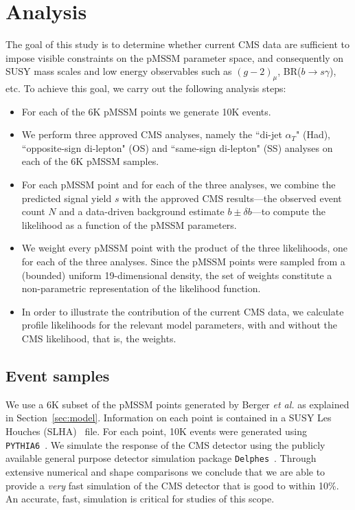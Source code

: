 \section{Analysis}

The goal of this study is to determine whether current CMS data are sufficient to impose visible constraints on the pMSSM parameter space, and consequently on SUSY mass scales and low energy observables such as $(g-2)_\mu$, BR($b\rightarrow s\gamma$), etc.  To achieve this goal, we carry out the following analysis steps:
\begin{itemize}
\item For each of the 6K pMSSM points we generate 10K events.
\item We perform three approved CMS analyses, namely the
 ``di-jet $\alpha_T$" (Had), ``opposite-sign di-lepton" (OS) and ``same-sign di-lepton" (SS) 
 analyses on each of the 6K pMSSM samples.
\item For each pMSSM point and for each of the three analyses, we combine the 
predicted signal yield $s$ with the approved CMS results---the
observed event count $N$ and 
a data-driven background estimate $b \pm \delta b$---to compute the likelihood as a function
of the pMSSM parameters. 
\item We weight every pMSSM point with the product of the three likelihoods, one  for each
of the three analyses. Since the pMSSM points were sampled from a (bounded) 
uniform  19-dimensional density, the set of weights constitute a non-parametric 
representation of the likelihood function. 
\item In order to illustrate the contribution of the current CMS data, we calculate profile likelihoods 
for the relevant model parameters, with and without the CMS likelihood, that is, the weights.  \end{itemize}

\subsection{Event samples}

We use a 6K subset of the pMSSM points generated by Berger \emph{et al.} 
as explained in Section~\ref{sec:model}.  Information on each point is contained in a SUSY Les Houches (SLHA)~\cite{Skands:2003cj} file.  For each point, 10K events were generated using {\tt PYTHIA6}~\cite{Sjostrand:2006za}.  We simulate the response of the CMS detector using
the publicly available general purpose detector simulation package {\tt Delphes}~\cite{Ovyn:2009tx}.  Through extensive numerical and shape comparisons we
conclude that we are able to provide a \emph{very} fast simulation of the CMS detector 
that is good to within 10\%. An accurate,  fast, simulation is critical for studies
of this scope. 

